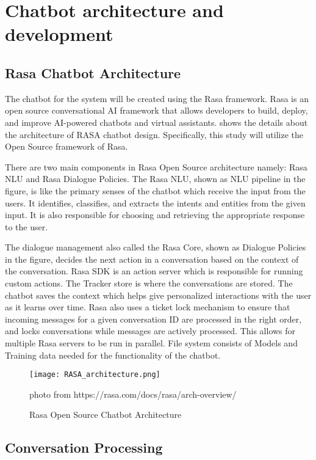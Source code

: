 \section{Chatbot architecture and development}

\subsection{Rasa Chatbot Architecture}

The chatbot for the system will be created using the Rasa framework. Rasa is an open source conversational AI framework that allows developers to build, deploy, and improve AI-powered chatbots and virtual assistants.  shows the details about the architecture of RASA chatbot design. Specifically, this study will utilize the Open Source framework of Rasa.

There are two main components in Rasa Open Source architecture namely: Rasa NLU and Rasa Dialogue Policies. The Rasa NLU, shown as NLU pipeline in the figure, is like the primary senses of the chatbot which receive the input from the users. It identifies, classifies, and extracts the intents and entities from the given input. It is also responsible for choosing and retrieving the appropriate response to the user. 

The dialogue management also called the Rasa Core, shown as Dialogue Policies in the figure, decides the next action in a conversation based on the context of the conversation. Rasa SDK is an action server which is responsible for running custom actions. The Tracker store is where the conversations are stored. The chatbot saves the context which helps give personalized interactions with the user as it learns over time. Rasa also uses a ticket lock mechanism to ensure that incoming messages for a given conversation ID are processed in the right order, and locks conversations while messages are actively processed. This allows for multiple Rasa servers to be run in parallel. File system consists of Models and Training data needed for the functionality of the chatbot.

\begin{figure}[h]
	\centering 
	\texttt{[image: RASA\_architecture.png]}
	\caption{Rasa Open Source Chatbot Architecture}
	photo from https://rasa.com/docs/rasa/arch-overview/
	\label{fig:rasa_architecture}
\end{figure}

\subsection {Conversation Processing}

